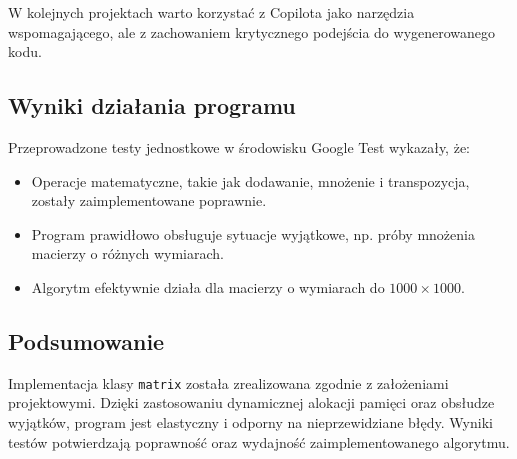 W kolejnych projektach warto korzystać z Copilota jako narzędzia wspomagającego, ale z zachowaniem krytycznego podejścia do wygenerowanego kodu.

\subsection{Wyniki działania programu}
Przeprowadzone testy jednostkowe w środowisku Google Test wykazały, że:
\begin{itemize}
  \item Operacje matematyczne, takie jak dodawanie, mnożenie i transpozycja, zostały zaimplementowane poprawnie.
  \item Program prawidłowo obsługuje sytuacje wyjątkowe, np. próby mnożenia macierzy o różnych wymiarach.
  \item Algorytm efektywnie działa dla macierzy o wymiarach do \(1000 \times 1000\).
\end{itemize}

\subsection{Podsumowanie}
Implementacja klasy \texttt{matrix} została zrealizowana zgodnie z założeniami projektowymi. Dzięki zastosowaniu dynamicznej alokacji pamięci oraz obsłudze wyjątków, program jest elastyczny i odporny na nieprzewidziane błędy. Wyniki testów potwierdzają poprawność oraz wydajność zaimplementowanego algorytmu.

